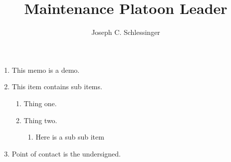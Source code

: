 \documentclass{./latex/armymemo-notikz}
\author{Joseph C. Schlessinger}\rank{1LT}\branch{EN}
\title{Maintenance Platoon Leader}
\begin{document}
\begin{enumerate}
\item This memo is a demo.
\item This item contains sub items.
\begin{enumerate}
\item Thing one.
\item Thing two.
\begin{enumerate}
\item Here is a sub sub item
\end{enumerate}
\end{enumerate}
\item Point of contact is the undersigned.
\end{enumerate}
\end{document}
